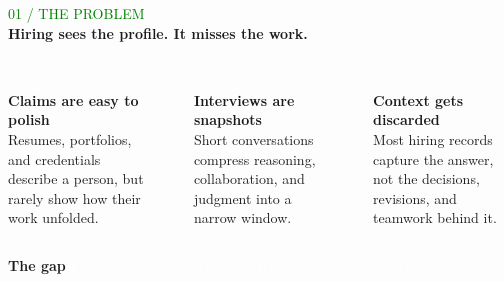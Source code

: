 \documentclass[aspectratio=169,10pt]{beamer}
\newcommand{\kicker}[1]{\textcolor{Green}{\fontsize{7.5}{9}\selectfont\ttfamily\MakeUppercase{#1}}}
\newcommand{\titleline}[2]{%
  {\kicker{#1}}\\[-1pt]
  {\fontsize{23}{26}\selectfont\bfseries #2}\\[3pt]
}
\begin{document}
\begin{frame}
  \titleline{01 / THE PROBLEM}{Hiring sees the profile. It misses the work.}
  \vspace{.35cm}
  \begin{columns}[T,onlytextwidth]
      {\color{Orange}\fontsize{10}{12}\selectfont{}}\\[.35cm]
      {\fontsize{16}{19}\selectfont\bfseries Claims are easy to polish}\\[.18cm]
      {\fontsize{9.5}{13}\selectfont\color{Muted}Resumes, portfolios, and credentials describe a person, but rarely show how their work unfolded.}
    \centering\textcolor{Line}{\rule{.5pt}{3.45cm}}
      {\color{Orange}\fontsize{10}{12}\selectfont{}}\\[.35cm]
      {\fontsize{16}{19}\selectfont\bfseries Interviews are snapshots}\\[.18cm]
      {\fontsize{9.5}{13}\selectfont\color{Muted}Short conversations compress reasoning, collaboration, and judgment into a narrow window.}
    \centering\textcolor{Line}{\rule{.5pt}{3.45cm}}
      {\color{Orange}\fontsize{10}{12}\selectfont{}}\\[.35cm]
      {\fontsize{16}{19}\selectfont\bfseries Context gets discarded}\\[.18cm]
      {\fontsize{9.5}{13}\selectfont\color{Muted}Most hiring records capture the answer, not the decisions, revisions, and teamwork behind it.}
  \end{columns}
  \vfill
  \colorbox{Ink}{\parbox{\dimexpr\linewidth-2\fboxsep}{\vspace{.18cm}\hspace{.18cm}\textcolor{Acid}{\bfseries The gap}\hspace{.35cm}\textcolor{White}{A professional record should carry more than self-reported claims.}\vspace{.18cm}}}
\end{frame}
\end{document}

